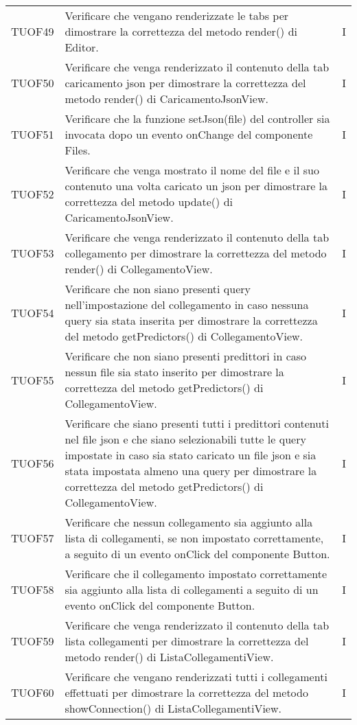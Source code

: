 \begin{longtable}{C{2cm} L{8cm} C{2cm}}

TUOF49 & Verificare che vengano renderizzate le tabs per dimostrare la correttezza del metodo render() di Editor. & I \\
TUOF50 & Verificare che venga renderizzato il contenuto della tab caricamento json per dimostrare la correttezza del metodo render() di CaricamentoJsonView. & I \\
TUOF51 & Verificare che la funzione setJson(file) del controller sia invocata dopo un evento onChange del componente Files. & I \\
TUOF52& Verificare che venga mostrato il nome del file e il suo contenuto una volta caricato un json per dimostrare la correttezza del metodo update() di CaricamentoJsonView. & I \\
TUOF53 & Verificare che venga renderizzato il contenuto della tab collegamento per dimostrare la correttezza del metodo render() di CollegamentoView. & I \\
TUOF54 & Verificare che non siano presenti query nell'impostazione del collegamento in caso nessuna query sia stata inserita per dimostrare la correttezza del metodo getPredictors() di CollegamentoView. & I \\
TUOF55 & Verificare che non siano presenti predittori in caso nessun file sia stato inserito per dimostrare la correttezza del metodo getPredictors() di CollegamentoView. & I \\
TUOF56 & Verificare che siano presenti tutti i predittori contenuti nel file json e che siano selezionabili tutte le query impostate in caso sia stato caricato un file json e sia stata impostata almeno una query per dimostrare la correttezza del metodo getPredictors() di CollegamentoView. & I \\
TUOF57 & Verificare che nessun collegamento sia aggiunto alla lista di collegamenti, se non impostato correttamente, a seguito di un evento onClick del componente Button. & I \\
TUOF58 & Verificare che il collegamento impostato correttamente sia aggiunto alla lista di collegamenti a seguito di un evento onClick del componente Button. & I \\
TUOF59 & Verificare che venga renderizzato il contenuto della tab lista collegamenti per dimostrare la correttezza del metodo render() di ListaCollegamentiView. & I \\
TUOF60 & Verificare che vengano renderizzati tutti i collegamenti effettuati per dimostrare la correttezza del metodo showConnection() di ListaCollegamentiView. & I \\

\end{longtable}
